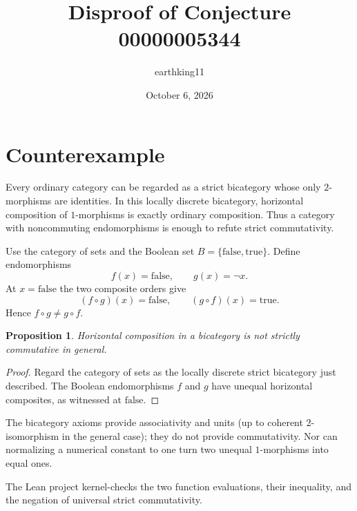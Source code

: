 \documentclass[11pt]{article}
\title{Disproof of Conjecture 00000005344}
\author{earthking11}
\date{October 6, 2026}
\newtheorem{proposition}{Proposition}
\begin{document}
\maketitle
\section*{Counterexample}
Every ordinary category can be regarded as a strict bicategory whose only
$2$-morphisms are identities.  In this locally discrete bicategory,
horizontal composition of $1$-morphisms is exactly ordinary composition.
Thus a category with noncommuting endomorphisms is enough to refute strict
commutativity.

Use the category of sets and the Boolean set $B=\{\mathrm{false},
\mathrm{true}\}$.  Define endomorphisms
\[
 f(x)=\mathrm{false},\qquad g(x)=\neg x.
\]
At $x=\mathrm{false}$ the two composite orders give
\[
 (f\circ g)(x)=\mathrm{false},\qquad
 (g\circ f)(x)=\mathrm{true}.
\]
Hence $f\circ g\ne g\circ f$.

\begin{proposition}
Horizontal composition in a bicategory is not strictly commutative in
general.
\end{proposition}
\begin{proof}
Regard the category of sets as the locally discrete strict bicategory just
described.  The Boolean endomorphisms $f$ and $g$ have unequal horizontal
composites, as witnessed at $\mathrm{false}$.
\end{proof}

The bicategory axioms provide associativity and units (up to coherent
$2$-isomorphism in the general case); they do not provide commutativity.
Nor can normalizing a numerical constant to one turn two unequal
$1$-morphisms into equal ones.

The Lean project kernel-checks the two function evaluations, their inequality,
and the negation of universal strict commutativity.
\end{document}
